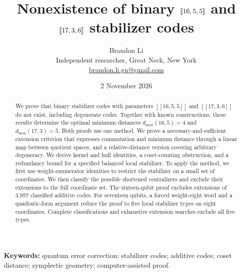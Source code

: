\documentclass[11pt]{article}
\title{Nonexistence of binary \(\qc{16,5,5}\) and
\(\qc{17,3,6}\) stabilizer codes}
\author{Brandon Li\\[0.2em]\normalsize Independent researcher, Great Neck, New York\\
\normalsize\href{mailto:brandon.li.gn@gmail.com}{brandon.li.gn@gmail.com}}
\date{2 November 2026}
\theoremstyle{definition}\newtheorem{definition}[theorem]{Definition}
\theoremstyle{remark}\newtheorem{remark}[theorem]{Remark}
\newcommand{\qc}[1]{[\![#1]\!]}
\begin{document}
\maketitle
\begin{abstract}
We prove that binary stabilizer codes with parameters \(\qc{16,5,5}\)
and \(\qc{17,3,6}\) do not exist, including degenerate codes.
Together with known constructions, these results determine the optimal
minimum distances \(d_{\max}(16,5)=4\) and \(d_{\max}(17,3)=5\).
Both proofs use one method.
We prove a necessary-and-sufficient extension criterion that expresses
commutation and minimum distance through a linear map between quotient
spaces, and a relative-distance version covering arbitrary degeneracy.
We derive kernel and hull identities, a coset-counting obstruction, and
a redundancy bound for a specified balanced local stabilizer.
To apply the method, we first use weight-enumerator identities to restrict
the stabilizer on a small set of coordinates. We then classify the possible
shortened centralizers and exclude their extensions to the full coordinate set.
The sixteen-qubit proof excludes extensions of 3,957 classified additive
codes. For seventeen qubits, a forced weight-eight word and a
quadratic-form argument reduce the proof to five local stabilizer types
on eight coordinates. Complete classifications and exhaustive extension
searches exclude all five types.
\end{abstract}
\textbf{Keywords:} quantum error correction; stabilizer codes; additive codes;
coset distance; symplectic geometry; computer-assisted proof.

\clearpage








\appendix




\end{document}
